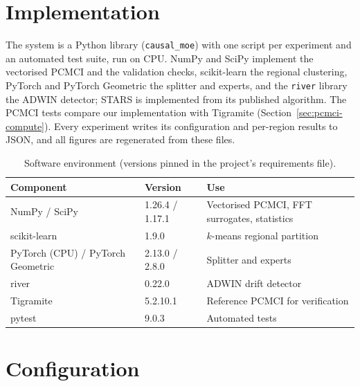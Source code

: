\label{chap:experiments}

\section{Implementation}
\label{sec:impl}

The system is a Python library (\texttt{causal\_moe}) with one script per experiment and an automated test suite, run on CPU. NumPy and SciPy implement the vectorised PCMCI and the validation checks, scikit-learn the regional clustering, PyTorch and PyTorch Geometric the splitter and experts, and the \texttt{river} library the ADWIN detector; STARS is implemented from its published algorithm. The PCMCI tests compare our implementation with Tigramite (Section~\ref{sec:pcmci-compute}). Every experiment writes its configuration and per-region results to JSON, and all figures are regenerated from these files.

\begin{table}[htbp]
\centering
\caption{Software environment (versions pinned in the project's requirements file).}
\label{tab:software}
\footnotesize
\begin{tabular}{lll}
\toprule
\textbf{Component} & \textbf{Version} & \textbf{Use} \\
\midrule
NumPy / SciPy & 1.26.4 / 1.17.1 & Vectorised PCMCI, FFT surrogates, statistics \\
scikit-learn & 1.9.0 & $k$-means regional partition \\
PyTorch (CPU) / PyTorch Geometric & 2.13.0 / 2.8.0 & Splitter and experts \\
river & 0.22.0 & ADWIN drift detector \\
Tigramite & 5.2.10.1 & Reference PCMCI for verification \\
pytest & 9.0.3 & Automated tests \\
\bottomrule
\end{tabular}
\end{table}

\section{Configuration}
\label{sec:impl-config}

